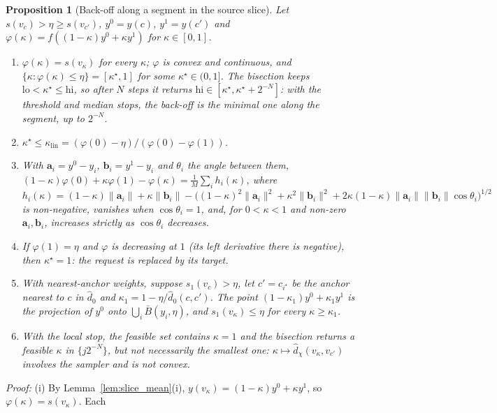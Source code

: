 \documentclass{article}
\theoremstyle{plain}
\newtheorem{proposition}[theorem]{Proposition}
\theoremstyle{remark}
\begin{document}
\begin{proposition}[Back-off along a segment in the source slice]\label{pr:slice_backoff}
Let $s(v_c)>\eta\ge s(v_{c'})$, $y^0=y(c)$, $y^1=y(c')$ and $\varphi(\kappa)=f((1-\kappa)y^0+\kappa y^1)$ for $\kappa\in[0,1]$.
\begin{enumerate}[label=(\roman*)]
\item $\varphi(\kappa)=s(v_\kappa)$ for every $\kappa$; $\varphi$ is convex and continuous, and $\{\kappa:\varphi(\kappa)\le\eta\}=[\kappa^\star,1]$
for some $\kappa^\star\in(0,1]$. The bisection keeps $\mathrm{lo}<\kappa^\star\le\mathrm{hi}$, so after $N$ steps it returns
$\mathrm{hi}\in[\kappa^\star,\kappa^\star+2^{-N}]$: with the threshold and median stops, the back-off is the minimal one along the segment,
up to $2^{-N}$.
\item $\kappa^\star\le\kappa_{\mathrm{lin}}=(\varphi(0)-\eta)/(\varphi(0)-\varphi(1))$.
\item With $\mathbf a_i=y^0-y_i$, $\mathbf b_i=y^1-y_i$ and $\theta_i$ the angle between them,
$(1-\kappa)\varphi(0)+\kappa\varphi(1)-\varphi(\kappa)=\frac1M\sum_ih_i(\kappa)$, where
$h_i(\kappa)=(1-\kappa)\|\mathbf a_i\|+\kappa\|\mathbf b_i\|-\big((1-\kappa)^2\|\mathbf a_i\|^2+\kappa^2\|\mathbf b_i\|^2+2\kappa(1-\kappa)\|\mathbf a_i\|\|\mathbf b_i\|\cos\theta_i\big)^{1/2}$
is non-negative, vanishes when $\cos\theta_i=1$, and, for $0<\kappa<1$ and non-zero $\mathbf a_i,\mathbf b_i$, increases strictly as
$\cos\theta_i$ decreases.
\item If $\varphi(1)=\eta$ and $\varphi$ is decreasing at $1$ (its left derivative there is negative), then $\kappa^\star=1$: the request is
replaced by its target.
\item With nearest-anchor weights, suppose $s_1(v_c)>\eta$, let $c'=c_{i^\star}$ be the anchor nearest to $c$ in $\hat d_0$ and
$\kappa_1=1-\eta/\hat d_0(c,c')$. The point $(1-\kappa_1)y^0+\kappa_1y^1$ is the projection of $y^0$ onto $\bigcup_i\bar B(y_i,\eta)$, and
$s_1(v_{\kappa})\le\eta$ for every $\kappa\ge\kappa_1$.
\item With the local stop, the feasible set contains $\kappa=1$ and the bisection returns a feasible $\kappa$ in $\{j2^{-N}\}$, but not
necessarily the smallest one: $\kappa\mapsto\hat d_\chi(v_\kappa,v_{c'})$ involves the sampler and is not convex.
\end{enumerate}
\end{proposition}
\textit{Proof:}
(i) By Lemma~\ref{lem:slice_mean}(i), $y(v_\kappa)=(1-\kappa)y^0+\kappa y^1$, so $\varphi(\kappa)=s(v_\kappa)$. Each
\end{document}
